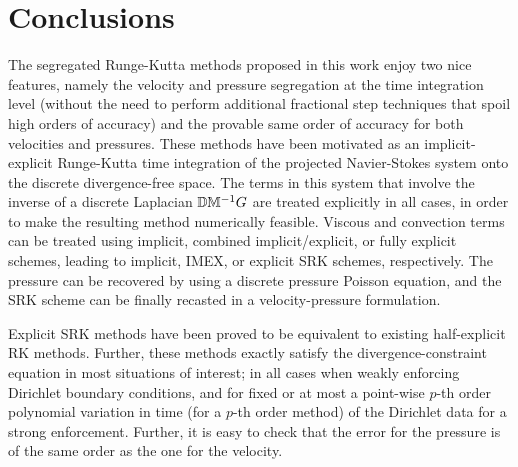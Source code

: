%
%

\section{Conclusions}
\label{sec-C6_conclusions}

The segregated Runge-Kutta methods proposed in this work enjoy two nice features, namely the velocity and pressure segregation at the time integration level (without the need to perform additional fractional step techniques that spoil high orders of accuracy) and the provable same order of accuracy for both velocities and pressures. These methods have been motivated as an implicit-explicit Runge-Kutta time integration of the projected Navier-Stokes system onto the discrete divergence-free space. The terms in this system that involve the inverse of a discrete Laplacian $\mathbb{D}\mathbb{M}^{-1} G$ are treated explicitly in all cases, in order to make the resulting method numerically feasible. Viscous and convection terms can be treated using implicit, combined implicit/explicit, or fully explicit schemes, leading to implicit, IMEX, or explicit SRK schemes, respectively. The pressure can be recovered by using a discrete pressure Poisson equation, and the SRK scheme can be finally recasted in a velocity-pressure formulation.

Explicit SRK methods have been proved to be equivalent to existing half-explicit RK methods. Further, these methods exactly satisfy the divergence-constraint equation in most situations of interest; in all cases when weakly enforcing Dirichlet boundary conditions, and for fixed or at most a point-wise $p$-th order polynomial variation in time (for a $p$-th order method) of the Dirichlet data for a strong enforcement. Further, it is easy to check that the error for the pressure is of the same order as the one for the velocity.

